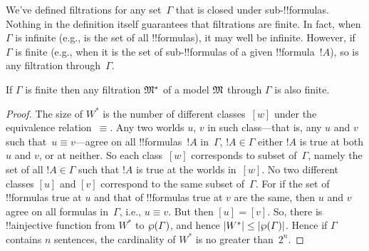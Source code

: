 \documentclass[../../../include/open-logic-section]{subfiles}
\begin{document}


We've defined filtrations for any set~$\Gamma$ that is closed under
sub-!!{formula}s. Nothing in the definition itself guarantees that
filtrations are finite. In fact, when $\Gamma$ is infinite (e.g., is
the set of all !!{formula}s), it may well be infinite. However, if
$\Gamma$ is finite (e.g., when it is the set of sub-!!{formula}s of a
given !!{formula}~$!A$), so is any filtration through~$\Gamma$.

\begin{prop}
  If $\Gamma$ is finite then any filtration $\mModel{M^*}$ of a model
  $\mModel{M}$ through $\Gamma$ is also finite.
\end{prop}

\begin{proof}
  The size of $W^*$ is the number of different classes~$[w]$ under the
  equivalence relation~$\equiv$. Any two worlds $u$, $v$ in such
  class---that is, any $u$ and $v$ such that~$u \equiv v$---agree on
  all !!{formula}s~$!A$ in~$\Gamma$, $!A \in \Gamma$ either $!A$ is
  true at both $u$ and $v$, or at neither. So each class~$[w]$
  corresponds to subset of~$\Gamma$, namely the set of all $!A \in
  \Gamma$ such that $!A$ is true at the worlds in~$[w]$. No two
  different classes $[u]$ and $[v]$ correspond to the same subset
  of~$\Gamma$. For if the set of !!{formula}s true at $u$ and that of
  !!{formula}s true at $v$ are the same, then $u$ and $v$ agree on all
  formulas in~$\Gamma$, i.e., $u \equiv v$. But then $[u] = [v]$.  So,
  there is !!a{injective} function from $W^*$ to $\wp(\Gamma)$, and
  hence $\left| W^* \right| \le \left| \wp(\Gamma) \right|$.  Hence if $\Gamma$
  contains $n$ sentences, the cardinality of $W^*$ is no greater
  than~$2^n$.
\end{proof}
\end{document}
